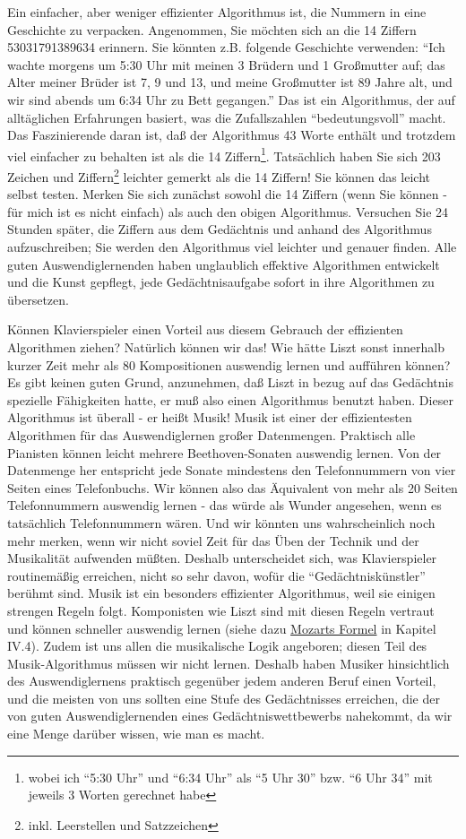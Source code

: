 Ein einfacher, aber weniger effizienter Algorithmus ist, die Nummern in eine Geschichte zu verpacken.
Angenommen, Sie möchten sich an die 14 Ziffern 53031791389634 erinnern.
Sie könnten z.B. folgende Geschichte verwenden: \enquote{Ich wachte morgens um 5:30 Uhr mit meinen 3 Brüdern und 1 Großmutter auf; das Alter meiner Brüder ist 7, 9 und 13, und meine Großmutter ist 89 Jahre alt, und wir sind abends um 6:34 Uhr zu Bett gegangen.}
Das ist ein Algorithmus, der auf alltäglichen Erfahrungen basiert, was die Zufallszahlen \enquote{bedeutungsvoll} macht.
Das Faszinierende daran ist, daß der Algorithmus 43 Worte enthält und trotzdem viel einfacher zu behalten ist als die 14 Ziffern\footnote{wobei ich \enquote{5:30 Uhr} und \enquote{6:34 Uhr} als \enquote{5 Uhr 30} bzw. \enquote{6 Uhr 34} mit jeweils 3 Worten gerechnet habe}.
Tatsächlich haben Sie sich 203 Zeichen und Ziffern\footnote{inkl. Leerstellen und Satzzeichen} leichter gemerkt als die 14 Ziffern!
Sie können das leicht selbst testen.
Merken Sie sich zunächst sowohl die 14 Ziffern (wenn Sie können - für mich ist es nicht einfach) als auch den obigen Algorithmus.
Versuchen Sie 24 Stunden später, die Ziffern aus dem Gedächtnis und anhand des Algorithmus aufzuschreiben; Sie werden den Algorithmus viel leichter und genauer finden.
Alle guten Auswendiglernenden haben unglaublich effektive Algorithmen entwickelt und die Kunst gepflegt, jede Gedächtnisaufgabe sofort in ihre Algorithmen zu übersetzen.

Können Klavierspieler einen Vorteil aus diesem Gebrauch der effizienten Algorithmen ziehen?
Natürlich können wir das!
Wie hätte Liszt sonst innerhalb kurzer Zeit mehr als 80 Kompositionen auswendig lernen und aufführen können?
Es gibt keinen guten Grund, anzunehmen, daß Liszt in bezug auf das Gedächtnis spezielle Fähigkeiten hatte, er muß also einen Algorithmus benutzt haben.
Dieser Algorithmus ist überall - er heißt Musik!
Musik ist einer der effizientesten Algorithmen für das Auswendiglernen großer Datenmengen.
Praktisch alle Pianisten können leicht mehrere Beethoven-Sonaten auswendig lernen.
Von der Datenmenge her entspricht jede Sonate mindestens den Telefonnummern von vier Seiten eines Telefonbuchs.
Wir können also das Äquivalent von mehr als 20 Seiten Telefonnummern auswendig lernen - das würde als Wunder angesehen, wenn es tatsächlich Telefonnummern wären.
Und wir könnten uns wahrscheinlich noch mehr merken, wenn wir nicht soviel Zeit für das Üben der Technik und der Musikalität aufwenden müßten.
Deshalb unterscheidet sich, was Klavierspieler routinemäßig erreichen, nicht so sehr davon, wofür die \enquote{Gedächtniskünstler} berühmt sind.
Musik ist ein besonders effizienter Algorithmus, weil sie einigen strengen Regeln folgt.
Komponisten wie Liszt sind mit diesen Regeln vertraut und können schneller auswendig lernen (siehe dazu \hyperlink{c1iv4}{Mozarts Formel} in Kapitel IV.4).
Zudem ist uns allen die musikalische Logik angeboren; diesen Teil des Musik-Algorithmus müssen wir nicht lernen.
Deshalb haben Musiker hinsichtlich des Auswendiglernens praktisch gegenüber jedem anderen Beruf einen Vorteil, und die meisten von uns sollten eine Stufe des Gedächtnisses erreichen, die der von guten Auswendiglernenden eines Gedächtniswettbewerbs nahekommt, da wir eine Menge darüber wissen, wie man es macht.

